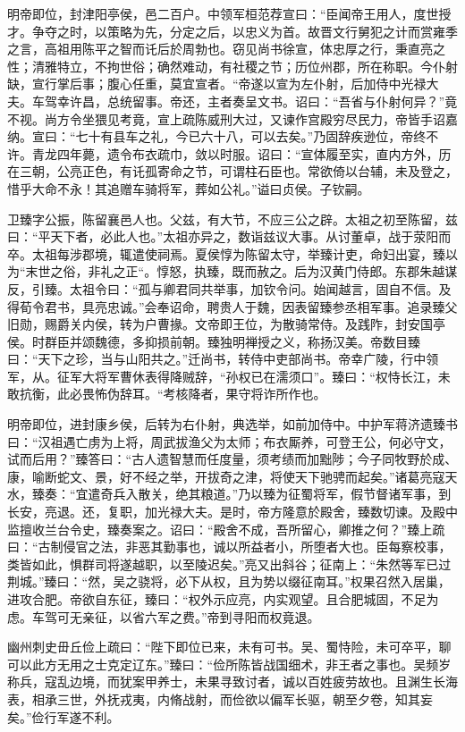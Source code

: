\documentclass[12pt,UTF8]{ctexbook}
\begin{document}
明帝即位，封津阳亭侯，邑二百户。中领军桓范荐宣曰：“臣闻帝王用人，度世授才。争夺之时，以策略为先，分定之后，以忠义为首。故晋文行舅犯之计而赏雍季之言，高祖用陈平之智而讬后於周勃也。窃见尚书徐宣，体忠厚之行，秉直亮之性；清雅特立，不拘世俗；确然难动，有社稷之节；历位州郡，所在称职。今仆射缺，宣行掌后事；腹心任重，莫宜宣者。“帝遂以宣为左仆射，后加侍中光禄大夫。车驾幸许昌，总统留事。帝还，主者奏呈文书。诏曰：“吾省与仆射何异？”竟不视。尚方令坐猥见考竟，宣上疏陈威刑大过，又谏作宫殿穷尽民力，帝皆手诏嘉纳。宣曰：“七十有县车之礼，今已六十八，可以去矣。”乃固辞疾逊位，帝终不许。青龙四年薨，遗令布衣疏巾，敛以时服。诏曰：“宣体履至实，直内方外，历在三朝，公亮正色，有讬孤寄命之节，可谓柱石臣也。常欲倚以台辅，未及登之，惜乎大命不永！其追赠车骑将军，葬如公礼。”谥曰贞侯。子钦嗣。

卫臻字公振，陈留襄邑人也。父兹，有大节，不应三公之辟。太祖之初至陈留，兹曰：“平天下者，必此人也。”太祖亦异之，数诣兹议大事。从讨董卓，战于荥阳而卒。太祖每涉郡境，辄遣使祠焉。夏侯惇为陈留太守，举臻计吏，命妇出宴，臻以为“末世之俗，非礼之正“。惇怒，执臻，既而赦之。后为汉黄门侍郎。东郡朱越谋反，引臻。太祖令曰：“孤与卿君同共举事，加钦令问。始闻越言，固自不信。及得荀令君书，具亮忠诚。”会奉诏命，聘贵人于魏，因表留臻参丞相军事。追录臻父旧勋，赐爵关内侯，转为户曹掾。文帝即王位，为散骑常侍。及践阼，封安国亭侯。时群臣并颂魏德，多抑损前朝。臻独明禅授之义，称扬汉美。帝数目臻曰：“天下之珍，当与山阳共之。”迁尚书，转侍中吏部尚书。帝幸广陵，行中领军，从。征军大将军曹休表得降贼辞，“孙权已在濡须口”。臻曰：“权恃长江，未敢抗衡，此必畏怖伪辞耳。“考核降者，果守将诈所作也。

明帝即位，进封康乡侯，后转为右仆射，典选举，如前加侍中。中护军蒋济遗臻书曰：“汉祖遇亡虏为上将，周武拔渔父为太师；布衣厮养，可登王公，何必守文，试而后用？”臻答曰：“古人遗智慧而任度量，须考绩而加黜陟；今子同牧野於成、康，喻断蛇文、景，好不经之举，开拔奇之津，将使天下驰骋而起矣。”诸葛亮寇天水，臻奏：“宜遣奇兵入散关，绝其粮道。”乃以臻为征蜀将军，假节督诸军事，到长安，亮退。还，复职，加光禄大夫。是时，帝方隆意於殿舍，臻数切谏。及殿中监擅收兰台令史，臻奏案之。诏曰：“殿舍不成，吾所留心，卿推之何？”臻上疏曰：“古制侵官之法，非恶其勤事也，诚以所益者小，所堕者大也。臣每察校事，类皆如此，惧群司将遂越职，以至陵迟矣。”亮又出斜谷；征南上：“朱然等军已过荆城。”臻曰：“然，吴之骁将，必下从权，且为势以缀征南耳。”权果召然入居巢，进攻合肥。帝欲自东征，臻曰：“权外示应亮，内实观望。且合肥城固，不足为虑。车驾可无亲征，以省六军之费。”帝到寻阳而权竟退。

幽州刺史毌丘俭上疏曰：“陛下即位已来，未有可书。吴、蜀恃险，未可卒平，聊可以此方无用之士克定辽东。”臻曰：“俭所陈皆战国细术，非王者之事也。吴频岁称兵，寇乱边境，而犹案甲养士，未果寻致讨者，诚以百姓疲劳故也。且渊生长海表，相承三世，外抚戎夷，内脩战射，而俭欲以偏军长驱，朝至夕卷，知其妄矣。”俭行军遂不利。
\end{document}
